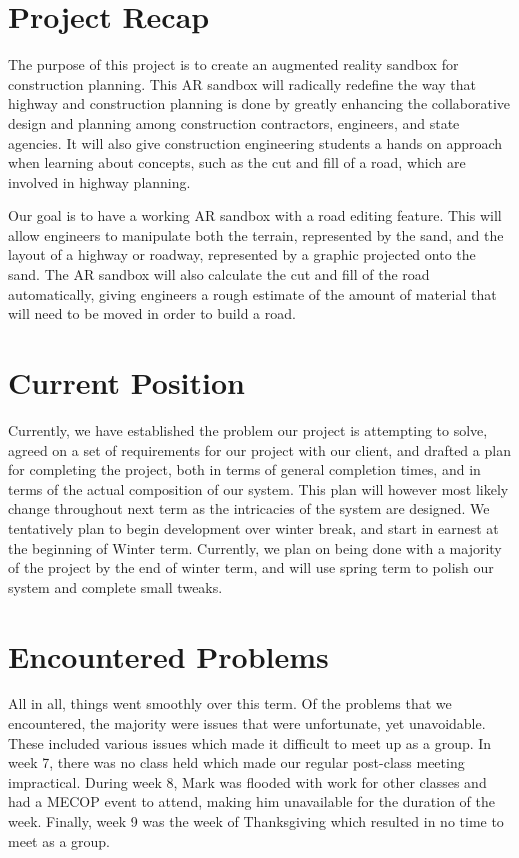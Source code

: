 \documentclass[onecolumn, draftclsnofoot,10pt, compsoc]{IEEEtran}
\begin{document}
\section{Project Recap} %
The purpose of this project is to create an augmented reality sandbox for construction planning.
This AR sandbox will radically redefine the way that highway and construction planning is done by greatly enhancing the collaborative design and planning among construction contractors, engineers, and state agencies.
It will also give construction engineering students a hands on approach when learning about concepts, such as the cut and fill of a road, which are involved in highway planning.

\par Our goal is to have a working AR sandbox with a road editing feature.
This will allow engineers to manipulate both the terrain, represented by the sand, and the layout of a highway or roadway, represented by a graphic projected onto the sand.
The AR sandbox will also calculate the cut and fill of the road automatically, giving engineers a rough estimate of the amount of material that will need to be moved in order to build a road.

\section{Current Position} %
Currently, we have established the problem our project is attempting to solve, agreed on a set of requirements for our project with our client, and drafted a plan for completing the project, both in terms of general completion times, and in terms of the actual composition of our system. This plan will however most likely change throughout next term as the intricacies of the system are designed. We tentatively plan to begin development over winter break, and start in earnest at the beginning of Winter term. Currently, we plan on being done with a majority of the project by the end of winter term, and will use spring term to polish our system and complete small tweaks.

\section{Encountered Problems} %
All in all, things went smoothly over this term.
Of the problems that we encountered, the majority were issues that were unfortunate, yet unavoidable.
These included various issues which made it difficult to meet up as a group.
In week 7, there was no class held which made our regular post-class meeting impractical.
During week 8, Mark was flooded with work for other classes and had a MECOP event to attend, making him unavailable for the duration of the week.
Finally, week 9 was the week of Thanksgiving which resulted in no time to meet as a group.
\end{document}
